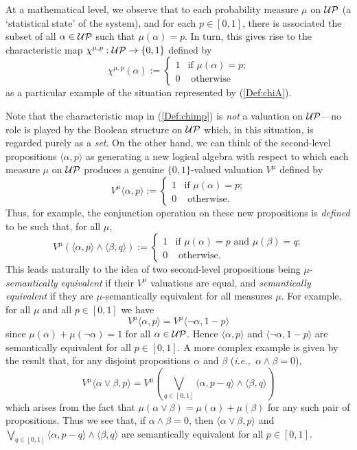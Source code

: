 \documentclass[12pt]{article}
\newcounter{def-number}[section]
\newcommand{\ba}{\begin{array}}
\newcommand{\ea}{\end{array}}
\newcommand{\beq}{\begin{equation}}
\newcommand{\eeq}{\end{equation}}
\newcommand{\eq}[1]{(\ref{#1})}
\newcommand{\ie}{{\em i.e.,\ }}
\renewcommand{\a}{\alpha}                   %
\renewcommand{\b}{\beta}                    %
\newcommand{\gp}[2]{\langle#1,#2\rangle}
\newcommand{\m}{\mu}
\newcommand{\map}{\rightarrow}
\newcommand{\UP}{{\cal UP}}
\begin{document}
	At a mathematical level, we observe that to each probability
measure $\m$ on $\UP$ (a `statistical state' of the system), and for
each $p\in[0,1]$, there is associated the subset of all $\a\in\UP$
such that $\mu(\a)=p$. In turn, this gives rise to the
characteristic map $\chi^{\m,p}:\UP\map\{0,1\}$ defined by
\beq
	\chi^{\m,p}(\a):=\left\{\ba{ll}
					  1 &\mbox{if $\mu(\a)=p$;}\label{Def:chimp}\\[3pt]
					  0 &\mbox{ otherwise}
						 \ea
					\right.
\eeq
as a particular example of the situation represented by
\eq{Def:chiA}.

	Note that the characteristic map in \eq{Def:chimp} is {\em
not\/} a valuation on $\UP$---no role is played by the Boolean
structure on $\UP$ which, in this situation, is regarded purely as a
{\em set\/}.  On the other hand, we can think of the second-level
propositions $\gp\a p$ as generating a new logical algebra with
respect to which each measure $\mu$ on $\UP$ produces a genuine
$\{0,1\}$-valued valuation $V^\m$ defined by
\beq
	V^\m\gp{\a}{p}:=\left\{\ba{ll}
					  1 &\mbox{if $\mu(\a)=p$;}\label{Def:Vm}\\[3pt]
					  0 &\mbox{ otherwise.}
						 \ea
					\right.
\eeq
Thus, for example, the conjunction operation on these new
propositions is {\em defined\/} to be such that, for all $\mu$, 
\beq
	V^\m(\gp{\a}{p}\land\gp{\b}{q})
					:=\left\{\ba{ll}
	1 &\mbox{if $\mu(\a)=p$ and $\mu(\b)=q$;}\label{Def:Vmand}\\[3pt]
					  0 &\mbox{ otherwise.}
						 \ea
					\right.	
\eeq
This leads naturally to the idea of two second-level propositions
being $\m$-{\em semantically equivalent\/} if their $V^\m$
valuations are equal, and {\em semantically equivalent\/} if they
are $\m$-semantically equivalent for all measures $\m$. For example,
for all $\mu$ and all $p\in[0,1]$ we have
\beq
		V^\m\gp{\a}p = V^\m\gp{\neg\a}{1-p}
\eeq
since $\mu(\a)+\mu(\neg\a)=1$ for all $\a\in\UP$. Hence $\gp\a p$
and $\gp{\neg\a}{1-p}$ are semantically equivalent for all
$p\in[0,1]$. A more complex example is given by the result that,
for any disjoint propositions $\a$ and $\b$ (\ie $\a\land\b=0$),
\beq
	V^\m\gp{\a\lor\b}p =
		V^\m\left(\bigvee_{q\in[0,1]}\gp{\a}{p-q}\land\gp{\b}q\right)
\eeq
which arises from the fact that $\mu(\a\lor\b)=\mu(\a)+\mu(\b)$ for
any such pair of propositions. Thus we see that, if $\a\land\b=0$,
then $\gp{\a\lor\b}p$ and
$\bigvee_{q\in[0,1]}\gp{\a}{p-q}\land\gp{\b}q$ are semantically
equivalent for all $p\in[0,1]$.
\end{document}
